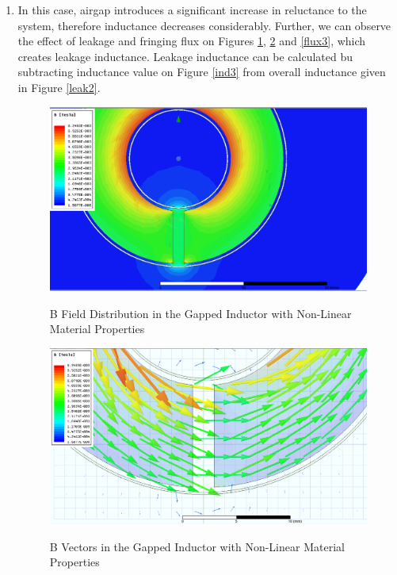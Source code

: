\begin{enumerate}
\item
In this case, airgap introduces a significant increase in reluctance to the system, therefore inductance decreases considerably. Further, we can observe the effect of leakage and fringing flux on Figures \ref{b3}, \ref{bvec3} and \ref{flux3}, which creates leakage inductance. Leakage inductance can be calculated bu subtracting inductance value on Figure \ref{ind3} from overall inductance given in Figure \ref{leak2}. 

\begin{figure}[H]
\hspace{1.5cm}
\centering\includegraphics[width=4.5in]{b_field_ag.PNG}\\
\caption{B Field Distribution in the Gapped Inductor with Non-Linear Material Properties}
\label{b3}
\end{figure} 

\begin{figure}[H]
\hspace{1.5cm}
\centering\includegraphics[width=4.5in]{airgap_b_vector.PNG}\\
\caption{B Vectors in the Gapped Inductor with Non-Linear Material Properties}
\label{bvec3}
\end{figure}


\end{enumerate}
